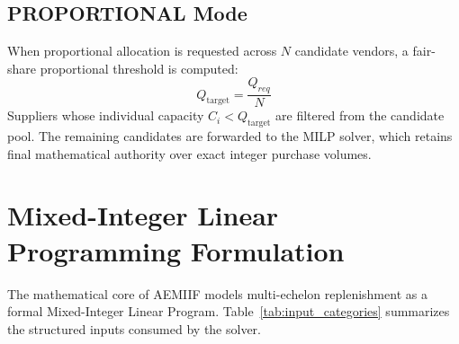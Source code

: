 \documentclass[conference]{IEEEtran}
\begin{document}
\subsection{PROPORTIONAL Mode}
When proportional allocation is requested across $N$ candidate vendors, a fair-share proportional threshold is computed:
\begin{equation}
Q_{\text{target}} = \frac{Q_{req}}{N}
\label{eq:prop_target}
\end{equation}
Suppliers whose individual capacity $C_i < Q_{\text{target}}$ are filtered from the candidate pool. The remaining candidates are forwarded to the MILP solver, which retains final mathematical authority over exact integer purchase volumes.

\section{Mixed-Integer Linear Programming Formulation}
The mathematical core of AEMIIF models multi-echelon replenishment as a formal Mixed-Integer Linear Program. Table~\ref{tab:input_categories} summarizes the structured inputs consumed by the solver.

\begin{table}[htbp]
\centering
\caption{Systematic Optimization Input Categorization}
\label{tab:input_categories}
\end{table}
\end{document}
